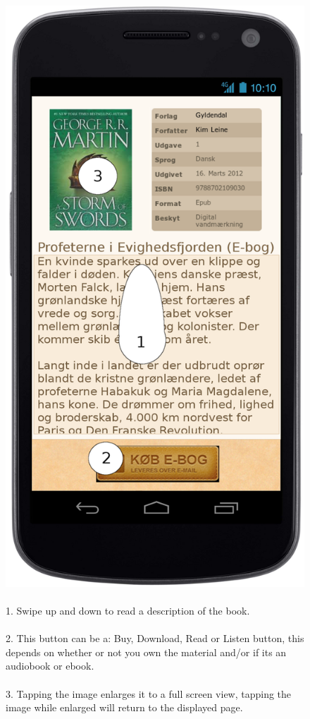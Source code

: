 \message{ !name(Rapport.tex)}\documentclass[12pt]{article}
\begin{document}
\begin{figure}
\includegraphics[scale=0.7]{gnexinfodownloadogkoeb.png}
\caption{
\\
1. Swipe up and down to read a description of the book.\\\\
2. This button can be a: Buy, Download, Read or Listen button, this depends on whether or not you own the material and/or if its an audiobook or ebook.\\\\
3. Tapping the image enlarges it to a full screen view, tapping the image while enlarged will return to the displayed page.
}
\label{Book information}
\end{figure}
\end{document}
